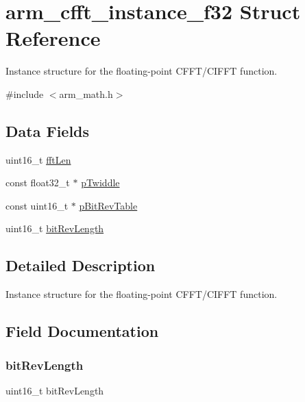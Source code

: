 \hypertarget{structarm__cfft__instance__f32}{}\section{arm\+\_\+cfft\+\_\+instance\+\_\+f32 Struct Reference}
\label{structarm__cfft__instance__f32}


Instance structure for the floating-\/point C\+F\+F\+T/\+C\+I\+F\+FT function.  




{\ttfamily \#include $<$arm\+\_\+math.\+h$>$}

\subsection*{Data Fields}
\begin{DoxyCompactItemize}
\item 
uint16\+\_\+t \mbox{\hyperlink{structarm__cfft__instance__f32_ab8db3bbe7c61e6bb8ca2a55e3446e11a}{fft\+Len}}
\item 
const float32\+\_\+t $\ast$ \mbox{\hyperlink{structarm__cfft__instance__f32_a8292d9775f5c5472f59915649fe3b378}{p\+Twiddle}}
\item 
const uint16\+\_\+t $\ast$ \mbox{\hyperlink{structarm__cfft__instance__f32_a3b229432d381b0a511a9cdbe3aa74e78}{p\+Bit\+Rev\+Table}}
\item 
uint16\+\_\+t \mbox{\hyperlink{structarm__cfft__instance__f32_a65e1b3e327b8fab9404287ed8f347cc8}{bit\+Rev\+Length}}
\end{DoxyCompactItemize}


\subsection{Detailed Description}
Instance structure for the floating-\/point C\+F\+F\+T/\+C\+I\+F\+FT function. 

\subsection{Field Documentation}
\mbox{\label{structarm__cfft__instance__f32_a65e1b3e327b8fab9404287ed8f347cc8}} 
\subsubsection{\texorpdfstring{bitRevLength}{bitRevLength}}
{\footnotesize\ttfamily uint16\+\_\+t bit\+Rev\+Length}

